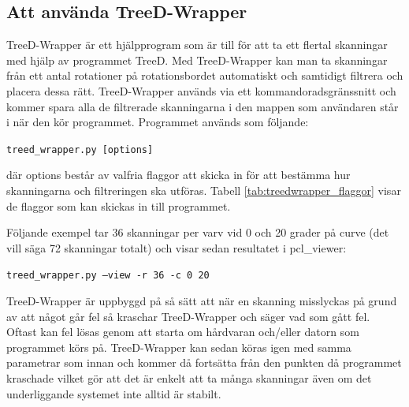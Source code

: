 \documentclass[a4paper,titlepage,12pt]{article}
\begin{document}
	\subsection{Att använda TreeD-Wrapper}
	TreeD-Wrapper är ett hjälpprogram som är till för att ta ett flertal skanningar med hjälp av programmet TreeD. Med TreeD-Wrapper kan man ta skanningar från ett antal rotationer på rotationsbordet automatiskt och samtidigt filtrera och placera dessa rätt. TreeD-Wrapper används via ett kommandoradsgränssnitt och kommer spara alla de filtrerade skanningarna i den mappen som användaren står i när den kör programmet. Programmet används som följande:
	
	\texttt{treed\_wrapper.py [options]}
	
	där options består av valfria flaggor att skicka in för att bestämma hur skanningarna och filtreringen ska utföras. Tabell \ref{tab:treedwrapper_flaggor} visar de flaggor som kan skickas in till programmet.
	
	Följande exempel tar 36 skanningar per varv vid 0 och 20 grader på curve (det vill säga 72 skanningar totalt) och visar sedan resultatet i pcl\_viewer:
	
	\texttt{treed\_wrapper.py --view -r 36 -c 0 20}
	
	TreeD-Wrapper är uppbyggd på så sätt att när en skanning misslyckas på grund av att något går fel så kraschar TreeD-Wrapper och säger vad som gått fel. Oftast kan fel lösas genom att starta om hårdvaran och/eller datorn som programmet körs på. TreeD-Wrapper kan sedan köras igen med samma parametrar som innan och kommer då fortsätta från den punkten då programmet kraschade vilket gör att det är enkelt att ta många skanningar även om det underliggande systemet inte alltid är stabilt.
		
\end{document}
